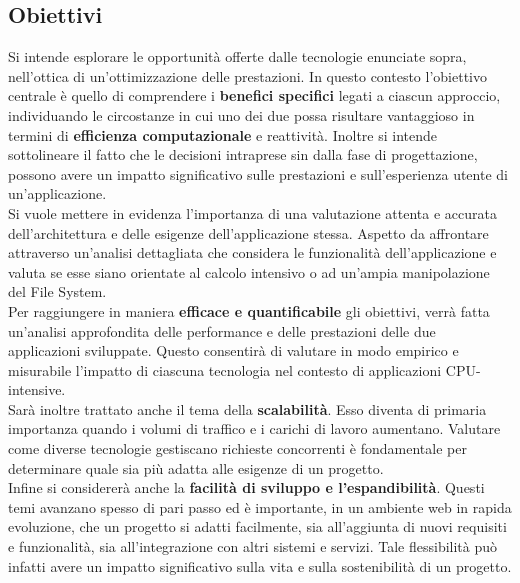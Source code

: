 \subsection{Obiettivi}
Si intende esplorare le opportunità offerte dalle tecnologie enunciate sopra, nell'ottica di un'ottimizzazione delle prestazioni.
In questo contesto l'obiettivo centrale è quello di comprendere i \textbf{benefici specifici} legati a ciascun approccio, individuando le circostanze in cui uno dei due possa risultare vantaggioso in termini di \textbf{efficienza computazionale} e reattività. 
Inoltre si intende sottolineare il fatto che le decisioni intraprese sin dalla fase di progettazione, possono avere un impatto significativo sulle prestazioni e sull'esperienza utente di un'applicazione.
\\Si vuole mettere in evidenza l'importanza di una valutazione attenta e accurata dell'architettura e delle esigenze dell'applicazione stessa.
Aspetto da affrontare attraverso un'analisi dettagliata che considera le funzionalità dell'applicazione e valuta se esse siano orientate al calcolo intensivo o ad un'ampia manipolazione del File System.
\\Per raggiungere in maniera \textbf{efficace e quantificabile} gli obiettivi, verrà fatta un'analisi approfondita delle performance e delle prestazioni delle due applicazioni sviluppate.
Questo consentirà di valutare in modo empirico e misurabile l'impatto di ciascuna tecnologia nel contesto di applicazioni CPU-intensive.
\\Sarà inoltre trattato anche il tema della \textbf{scalabilità}. Esso diventa di primaria importanza quando i volumi di traffico e i carichi di lavoro aumentano. Valutare come diverse tecnologie gestiscano richieste concorrenti è fondamentale per determinare quale sia più adatta alle esigenze di un progetto.
\\Infine si considererà anche la \textbf{facilità di sviluppo e l'espandibilità}. 
Questi temi avanzano spesso di pari passo ed è importante, in un ambiente web in rapida evoluzione, che un progetto si adatti facilmente, sia all'aggiunta di nuovi requisiti e funzionalità, sia all'integrazione con altri sistemi e servizi. Tale flessibilità può infatti avere un impatto significativo sulla vita e sulla sostenibilità di un progetto.


\newpage

